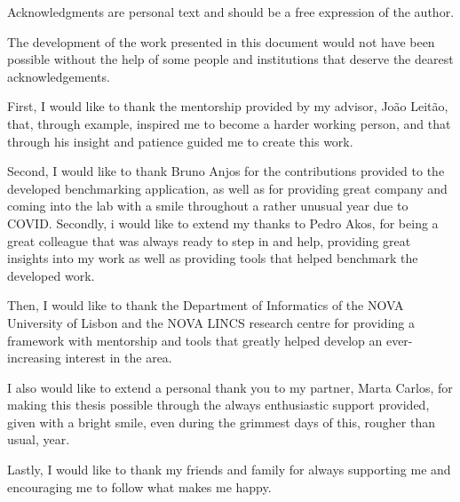 

\begin{ntacknowledgements}

Acknowledgments are personal text and should be a free expression of the author.


The development of the work presented in this document would not have been possible without the help of some people and institutions that deserve the dearest acknowledgements.

First, I would like to thank the mentorship provided by my advisor, João Leitão, that, through example, inspired me to become a harder working person, and that through his insight and patience guided me to create this work.

Second, I would like to thank Bruno Anjos for the contributions provided to the developed benchmarking application, as well as for providing great company and coming into the lab with a smile throughout a rather unusual year due to COVID. Secondly, i would like to extend my thanks to Pedro Akos, for being a great colleague that was always ready to step in and help, providing great insights into my work as well as providing tools that helped benchmark the developed work.

Then, I would like to thank the Department of Informatics of the NOVA University of Lisbon and the NOVA LINCS research centre for providing a framework with mentorship and tools that greatly helped develop an ever-increasing interest in the area.

I also would like to extend a personal thank you to my partner, Marta Carlos, for making this thesis possible through the always enthusiastic support provided, given with a bright smile, even during the grimmest days of this, rougher than usual, year.

Lastly, I would like to thank my friends and family for always supporting me and encouraging me to follow what makes me happy.



\end{ntacknowledgements}